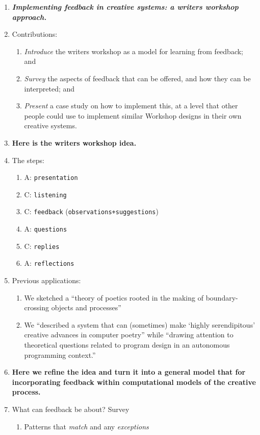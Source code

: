 \documentclass[letter]{article}
\newcommand{\dec}[1]{\raisebox{.2ex}{$\star$}#1\raisebox{.2ex}{$\star$}}
\begin{document}
{\small
\begin{enumerate}[start=0,label=\textbf{\arabic*}]
\item \textbf{\emph{Implementing feedback in creative systems: a writers
  workshop approach.}}
\item[] Contributions:
\begin{enumerate}
\item \emph{Introduce} the writers workshop as a model for learning
  from feedback; and
\item \emph{Survey} the aspects of feedback that can be offered, and
  how they can be interpreted; and
\item \emph{Present} a case study on how to implement this, at a level
  that other people could use to implement similar Workshop designs in
  their own creative systems.
\end{enumerate}
\item \textbf{Here is the writers workshop idea.}
\item[] The steps:
\begin{enumerate}
\item A: {\tt presentation}
\item C: {\tt listening}
\item C: {\tt feedback} ({\tt observations}{\tt+}{\tt suggestions})
\item A: {\tt questions}
\item C: {\tt replies}
\item A: {\tt reflections}
\end{enumerate}
\item[] Previous applications:
\begin{enumerate}[label=(\roman*)]
\item We sketched a ``theory of poetics rooted in the making of
  boundary-crossing objects and processes''
\item We ``described a system that can (sometimes) make `highly
  serendipitous' creative advances in computer poetry'' while
  ``drawing attention to theoretical questions related to program
  design in an autonomous programming context.''
\end{enumerate}
\item \textbf{Here we refine the idea and turn it into a general model
  that for incorporating feedback within computational models of the
  creative process.}
\item[] What can feedback be about? \dec{Survey}
\begin{enumerate}
\item Patterns that \emph{match} and any \emph{exceptions}

\end{enumerate}
\end{enumerate}}
\end{document}
